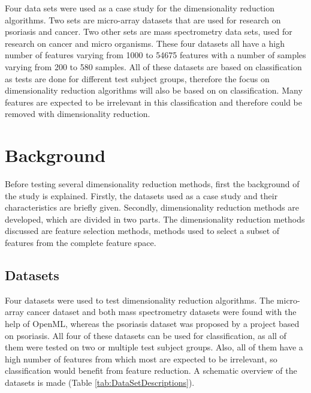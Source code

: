 \documentclass[10pt,a4paper]{article}
\begin{document}
	Four data sets were used as a case study for the dimensionality reduction algorithms. Two sets are micro-array datasets that are used for research on psoriasis\cite{nair2009genome, suarez2012expanding, bigler2013cross, yao2008type} and cancer\cite{wojnarski2010rsctc}. Two other sets are mass spectrometry data sets, used for research on cancer\cite{NIPS2004_2728} and micro organisms\cite{doi:10.1093/bioinformatics/btu022}. These four datasets all have a high number of features varying from 1000 to 54675 features with a number of samples varying from 200 to 580 samples. All of these datasets are based on classification as tests are done for different test subject groups, therefore the focus on dimensionality reduction algorithms will also be based on on classification. Many features are expected to be irrelevant in this classification and therefore could be removed with dimensionality reduction.	
	
	\section{Background}
	\label{sec:Background}
	
	Before testing several dimensionality reduction methods, first the background of the study is explained. Firstly, the datasets used as a case study and their characteristics are briefly given. Secondly, dimensionality reduction methods are developed, which are divided in two parts. The dimensionality reduction methods discussed are feature selection methods, methods used to select a subset of features from the complete feature space. 
	
	
	\subsection{Datasets}
	\label{subsec:Datasets}
	
	Four datasets were used to test dimensionality reduction algorithms. The micro-array cancer dataset and both mass spectrometry datasets were found with the help of OpenML\cite{OpenML2013}, whereas the psoriasis dataset was proposed by a project based on psoriasis\cite{felix2017dynamic}. All four of these datasets can be used for classification, as all of them were tested on two or multiple test subject groups. Also, all of them have a high number of features from which most are expected to be irrelevant, so classification would benefit from feature reduction. A schematic overview of the datasets is made (Table \ref{tab:DataSetDescriptions}).
	
\end{document}
